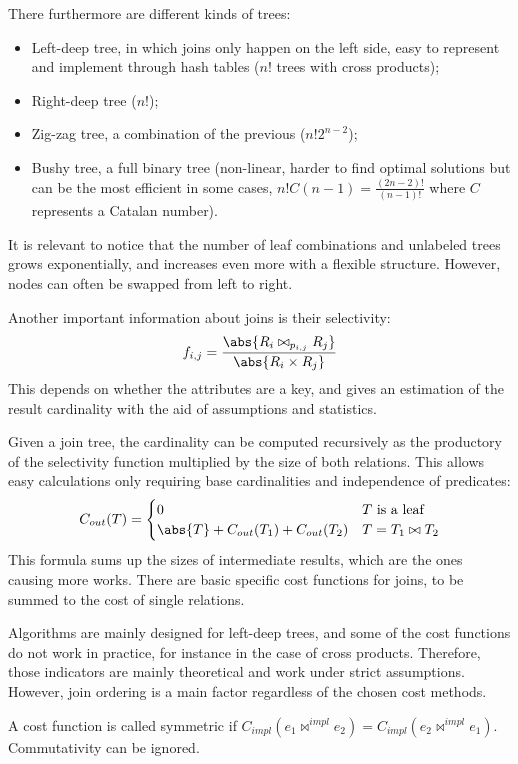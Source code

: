 There furthermore are different kinds of trees:
\begin{itemize}
	\item Left-deep tree, in which joins only happen on the left side, easy to represent and implement through hash tables ($n!$ trees with cross products);
	\item Right-deep tree ($n!$);
	\item Zig-zag tree, a combination of the previous ($n!2^{n-2}$);
	\item Bushy tree, a full binary tree (non-linear, harder to find optimal solutions but can be the most efficient in some cases, $n!C(n-1) = \frac{(2n-2)!}{(n-1)!}$ where $C$ represents a Catalan number).
\end{itemize}
It is relevant to notice that the number of leaf combinations and unlabeled trees grows exponentially, and increases even more with a flexible structure. However, nodes can often be swapped from left to right.

Another important information about joins is their selectivity: 
$$f_{i, j} = \frac{\abs{R_i \bowtie_{p_{i, j}} R_j}}{\abs{R_i \times R_j}}$$
This depends on whether the attributes are a key, and gives an estimation of the result cardinality with the aid of assumptions and statistics.

Given a join tree, the cardinality can be computed recursively as the productory of the selectivity function multiplied by the size of both relations. This allows easy calculations only requiring base cardinalities and independence of predicates:
$$C_{out}(T) = \begin{cases}
0 & T\text{ is a leaf} \\
\abs{T} + C_{out}(T_1) + C_{out}(T_2) & T = T_1 \bowtie T_2
\end{cases}$$
This formula sums up the sizes of intermediate results, which are the ones causing more works. There are basic specific cost functions for joins, to be summed to the cost of single relations. 

Algorithms are mainly designed for left-deep trees, and some of the cost functions do not work in practice, for instance in the case of cross products. Therefore, those indicators are mainly theoretical and work under strict assumptions. However, join ordering is a main factor regardless of the chosen cost methods.

A cost function is called symmetric if $C_{impl}(e_1 \bowtie^{impl} e_2) = C_{impl}(e_2 \bowtie^{impl} e_1)$. Commutativity can be ignored.

